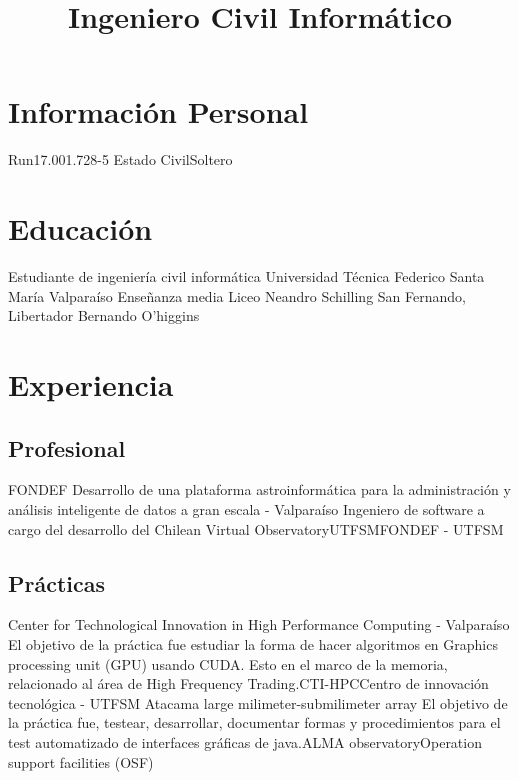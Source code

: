 \documentclass[11pt,a4paper]{moderncv}
\title{Ingeniero Civil Informático}
\begin{document}
\maketitle

\section{Información Personal}
	{Run}{17.001.728-5}
			{Estado Civil}{Soltero}
          				{}{}

\section{Educación}
	{Estudiante de ingeniería civil informática}
	{Universidad Técnica Federico Santa María}
	{Valparaíso}
	{}
	{}
	{Enseñanza media}
	{Liceo Neandro Schilling}
	{San Fernando, Libertador Bernando O'higgins}
	{}{}

\section{Experiencia}
\subsection{Profesional}
	{FONDEF Desarrollo de una plataforma astroinformática para la administración y análisis inteligente de datos a gran escala - Valparaíso}
	{Ingeniero de software a cargo del desarrollo del Chilean Virtual Observatory}{UTFSM}{FONDEF - UTFSM}{}

\subsection{Prácticas}
	{Center for Technological Innovation in High Performance Computing - Valparaíso}
	{El objetivo de la práctica fue estudiar la forma de hacer algoritmos en Graphics processing unit (GPU) usando CUDA. Esto en el marco
	de la memoria, relacionado al área de High Frequency Trading.}{CTI-HPC}{Centro de innovación tecnológica - UTFSM}{}
	{Atacama large milimeter-submilimeter array}
	{El objetivo de la práctica fue, testear, desarrollar, documentar formas y procedimientos para el test automatizado de 
	interfaces gráficas de java.}{ALMA observatory}{Operation support facilities (OSF)}{}
\end{document}
